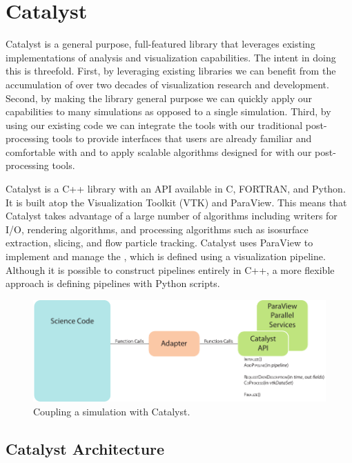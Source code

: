 \section{Catalyst}
\label{sec:Catalyst}

Catalyst is a general purpose, full-featured library that leverages existing
implementations of analysis and visualization capabilities.
The intent in doing this is threefold.  First, by leveraging existing
\vda libraries we can benefit from the accumulation of over two decades of
visualization research and development.  Second, by making the library general
purpose we can quickly apply our \insitu \vda capabilities to many simulations
as opposed to a single simulation.  Third, by using our existing code we can
integrate the \insitu tools with our traditional post-processing tools to
provide interfaces that users are already familiar and comfortable with and to
apply scalable algorithms designed for \insitu with our post-processing tools.


Catalyst is a C++ library with an API available in C, FORTRAN, and
Python.  It is built atop the Visualization Toolkit (VTK) and
ParaView.  This means that Catalyst takes advantage of a
large number of algorithms including writers for I/O, rendering algorithms,
and processing algorithms such as isosurface extraction, slicing, and flow
particle tracking.  Catalyst uses ParaView to implement and manage the
\vda, which is defined using a visualization
pipeline.  Although it is possible to construct
pipelines entirely in C++, a more flexible approach is defining pipelines 
with Python scripts.

\begin{figure}[htb]
  \centering
  \includegraphics{figures/CatalystCoupling}
  \caption{Coupling a simulation with Catalyst.}
  \label{fig:CatalystCoupling}
\end{figure}

\subsection{Catalyst Architecture}

